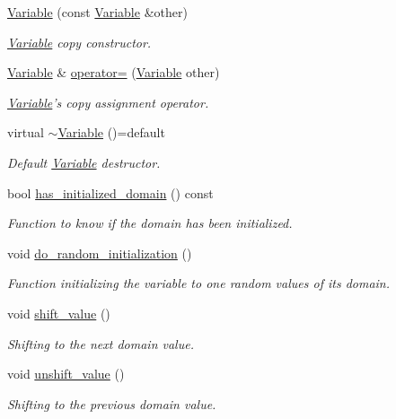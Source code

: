 \begin{DoxyCompactItemize}
\hyperlink{classghost_1_1Variable_ac9fb0513e1d15a047816821e034589ea}{Variable} (const \hyperlink{classghost_1_1Variable}{Variable} \&other)
\begin{DoxyCompactList}\small\item\em \hyperlink{classghost_1_1Variable}{Variable} copy constructor. \end{DoxyCompactList}\item 
\hyperlink{classghost_1_1Variable}{Variable} \& \hyperlink{classghost_1_1Variable_ad82b892892c3531cc3d54d6b5d048bf6}{operator=} (\hyperlink{classghost_1_1Variable}{Variable} other)
\begin{DoxyCompactList}\small\item\em \hyperlink{classghost_1_1Variable}{Variable}'s copy assignment operator. \end{DoxyCompactList}\item 
virtual \hyperlink{classghost_1_1Variable_a718686ab389bd31ae0f3cbb312c9be77}{$\sim$\-Variable} ()=default
\begin{DoxyCompactList}\small\item\em Default \hyperlink{classghost_1_1Variable}{Variable} destructor. \end{DoxyCompactList}\item 
bool \hyperlink{classghost_1_1Variable_a3c858960deefe1fd3d685bf0440e50c5}{has\-\_\-initialized\-\_\-domain} () const 
\begin{DoxyCompactList}\small\item\em Function to know if the domain has been initialized. \end{DoxyCompactList}\item 
void \hyperlink{classghost_1_1Variable_a37018e24ee21e12649599409d7ac3640}{do\-\_\-random\-\_\-initialization} ()
\begin{DoxyCompactList}\small\item\em Function initializing the variable to one random values of its domain. \end{DoxyCompactList}\item 
void \hyperlink{classghost_1_1Variable_accb4028c4ea4c1108aac7900dfa223fc}{shift\-\_\-value} ()
\begin{DoxyCompactList}\small\item\em Shifting to the next domain value. \end{DoxyCompactList}\item 
void \hyperlink{classghost_1_1Variable_a7815ce9c582316082e88c2bb3137a914}{unshift\-\_\-value} ()
\begin{DoxyCompactList}\small\item\em Shifting to the previous domain value. \end{DoxyCompactList}\item 

\end{DoxyCompactItemize}
